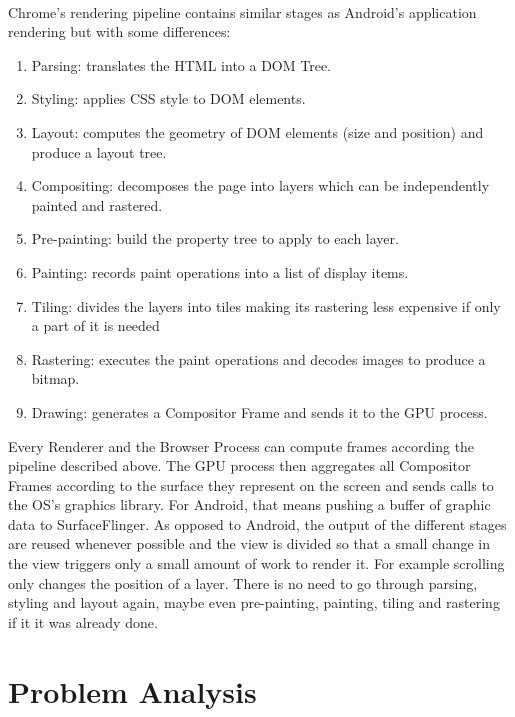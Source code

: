\documentclass{kththesis}
\begin{document}
\paragraph{}
Chrome's rendering pipeline \cite{chrome_pixel} contains similar stages as Android's application rendering but with some differences: 
\begin{enumerate}
    \item Parsing: translates the HTML into a DOM Tree.
    \item Styling: applies CSS style to DOM elements.
    \item Layout: computes the geometry of DOM elements (size and position) and produce a layout tree.
    \item Compositing: decomposes the page into layers which can be independently painted and rastered.
    \item Pre-painting: build the property tree to apply to each layer.
    \item Painting: records paint operations into a list of display items.
    \item Tiling: divides the layers into tiles making its rastering less expensive if only a part of it is needed
    \item Rastering: executes the paint operations and decodes images to produce a bitmap.
    \item Drawing: generates a Compositor Frame and sends it to the GPU process.
\end{enumerate}
Every Renderer and the Browser Process can compute frames according the pipeline described above. The GPU process then aggregates all Compositor Frames according to the surface they represent on the screen  and sends calls to the OS's graphics library. For Android, that means pushing a buffer of graphic data to SurfaceFlinger.
\newline
As opposed to Android, the output of the different stages are reused whenever possible and the view is divided so that a small change in the view triggers only a small amount of work to render it. 
For example scrolling only changes the position of a layer. There is no need to go through parsing, styling and layout again, maybe even pre-painting, painting, tiling and rastering if it it was already done.

\section{Problem Analysis}
\end{document}
